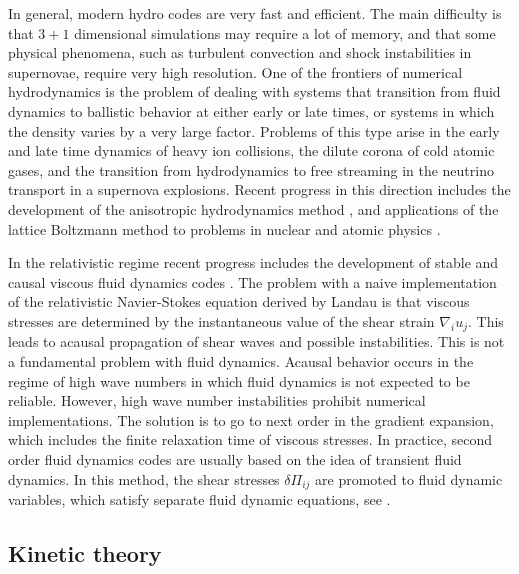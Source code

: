  In general, modern hydro codes are very fast and efficient. The main 
difficulty is that $3+1$ dimensional simulations may require a lot 
of memory, and that some physical phenomena, such as turbulent 
convection and shock instabilities in supernovae, require very high 
resolution. One of the frontiers of numerical hydrodynamics is the 
problem of dealing with systems that transition from fluid dynamics
to ballistic behavior at either early or late times, or systems in
which the density varies by a very large factor. Problems of this 
type arise in the early and late time dynamics of heavy ion collisions, 
the dilute corona of cold atomic gases, and the transition from 
hydrodynamics to free streaming in the neutrino transport in a 
supernova explosions. Recent progress in this direction includes
the development of the anisotropic hydrodynamics method 
\cite{Florkowski:2010cf,Martinez:2010sc,Bluhm:2015raa,Bluhm:2015bzi}, 
and applications of the lattice Boltzmann method to problems in nuclear 
and atomic physics \cite{Romatschke:2011hm,Brewer:2015hua}.

 In the relativistic regime recent progress includes the development of 
stable and causal viscous fluid dynamics codes 
\cite{Romatschke:2009im,Jeon:2015dfa}. The problem with a naive 
implementation of the relativistic Navier-Stokes equation derived
by Landau is that viscous stresses are determined by the instantaneous
value of the shear strain $\nabla_i u_j$. This leads to acausal
propagation of shear waves and possible instabilities. This is not 
a fundamental problem with fluid dynamics. Acausal behavior occurs 
in the regime of high wave numbers in which fluid dynamics is not 
expected to be reliable. However, high wave number instabilities 
prohibit numerical implementations. The solution is to go to next order
in the gradient expansion, which includes the finite relaxation time 
of viscous stresses. In practice, second order fluid dynamics codes
are usually based on the idea of transient fluid dynamics. In this
method, the shear stresses $\delta\Pi_{ij}$ are promoted to fluid
dynamic variables, which satisfy separate fluid dynamic equations, 
see \cite{Romatschke:2009im,Jeon:2015dfa}.

\subsection{Kinetic theory}


